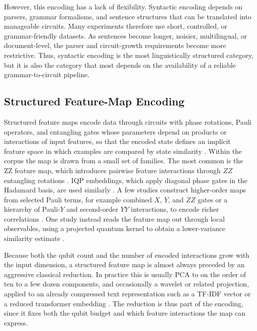\documentclass{ieeeaccess}
\begin{document}
However, this encoding has a lack of flexibility. Syntactic encoding depends on parsers, grammar formalisms, and sentence structures that can be translated into manageable circuits. Many experiments therefore use short, controlled, or grammar-friendly datasets. As sentences become longer, noisier, multilingual, or document-level, the parser and circuit-growth requirements become more restrictive. Thus, syntactic encoding is the most linguistically structured category, but it is also the category that most depends on the availability of a reliable grammar-to-circuit pipeline.

\subsection{Structured Feature-Map Encoding}
\label{subsec:iqp_encoding}
Structured feature maps encode data through circuits with phase rotations, Pauli operators, and entangling gates whose parameters depend on products or interactions of input features, so that the encoded state defines an implicit feature space in which examples are compared by state similarity \cite{schuld2019quantum}. Within the corpus the map is drawn from a small set of families. The most common is the ZZ feature map, which introduces pairwise feature interactions through $ZZ$ entangling rotations \cite{widdows_near-term_2024,baik_neural_2025,sunkavalli_experimentation_2024}. IQP embeddings, which apply diagonal phase gates in the Hadamard basis, are used similarly \cite{djemmal_arabert-qc_2025,ruskanda_quantum-enhanced_2023}. A few studies construct higher-order maps from selected Pauli terms, for example combined $X$, $Y$, and $ZZ$ gates or a hierarchy of Pauli-$Y$ and second-order $YY$ interactions, to encode richer correlations \cite{katyayan_supervised_2023,ruskanda_quantum-enhanced_2023}. One study instead reads the feature map out through local observables, using a projected quantum kernel to obtain a lower-variance similarity estimate \cite{keith-norambuena_quantum_2026}.

Because both the qubit count and the number of encoded interactions grow with the input dimension, a structured feature map is almost always preceded by an aggressive classical reduction. In practice this is usually PCA to on the order of ten to a few dozen components, and occasionally a wavelet or related projection, applied to an already compressed text representation such as a TF-IDF vector or a reduced transformer embedding \cite{mohammad_masum_hybrid_2023,djemmal_arabert-qc_2025,jagatheesan_quantum_2026}. The reduction is thus part of the encoding, since it fixes both the qubit budget and which feature interactions the map can express.
\end{document}

